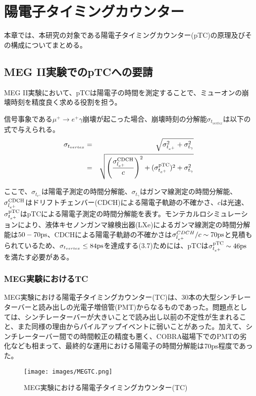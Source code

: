 \documentclass[Yonemoto_master.tex]{subfiles}
\begin{document}
\chapter{陽電子タイミングカウンター}
本章では、本研究の対象である陽電子タイミングカウンター(pTC)の原理及びその構成についてまとめる。
\section{MEG II実験でのpTCへの要請}
MEG II実験において、pTCは陽電子の時間を測定することで、ミューオンの崩壊時刻を精度良く求める役割を担う。

信号事象である$\mu^+ \to e^+\gamma$崩壊が起こった場合、崩壊時刻の分解能$\sigma_{t_{vertex}}$は以下の式で与えられる。 \\

\begin{eqnarray}
\sigma_{t_{vertex}} & = & \sqrt{\sigma_{t_{e^+}}^2 + \sigma_{t_{\gamma}}^2} \nonumber \\ 
& = & \sqrt{\left( \frac{\sigma_{l_{e^+}}^{\rm CDCH}}{c} \right)^2 + (\sigma_{t_{e^+}}^{\rm pTC})^2 + \sigma_{t_{\gamma}}^2}
\end{eqnarray}

ここで、$\sigma_{t_{e^+}}$は陽電子測定の時間分解能、$\sigma_{t_{\gamma}}$はガンマ線測定の時間分解能、$\sigma_{l_{e^+}}^{\rm CDCH}$はドリフトチェンバー(CDCH)による陽電子軌跡の不確かさ、$c$は光速、$\sigma_{t_{e^+}}^{\rm pTC}$はpTCによる陽電子測定の時間分解能を表す。モンテカルロシミュレーションにより、液体キセノンガンマ線検出器(LXe)によるガンマ線測定の時間分解能は$50-70 \rm ps$、CDCHによる陽電子軌跡の不確かさは$\sigma_{l_{e^+}}^{CDCH}/c \sim 70 \rm ps$と見積もられているため、$\sigma_{t_{vertex}} \le 84 \rm ps$を達成する(3.7)ためには、pTCは$\sigma_{t_{e^+}}^{\rm pTC} \sim 46 \rm ps$を満たす必要がある。

\subsection{MEG実験におけるTC}
MEG実験における陽電子タイミングカウンター(TC)は、30本の大型シンチレーターバーと読み出しの光電子増倍管(PMT)からなるものであった。問題点としては、シンチレーターバーが大きいことで読み出し以前の不定性が生まれること、また同様の理由からパイルアップイベントに弱いことがあった。加えて、シンチレーターバー間での時間較正の精度も悪く、COBRA磁場下でのPMTの劣化なども相まって、最終的な運用における陽電子の時間分解能は$70 \rm ps$程度であった。

\begin{figure}[h]
\begin{center}
\texttt{[image: images/MEGTC.png]}
\caption{MEG実験における陽電子タイミングカウンター(TC)}
\end{center}
\end{figure}
\end{document}
